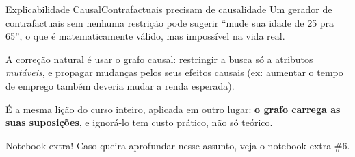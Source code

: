 \begin{frame}{Explicabilidade Causal}{Contrafactuais precisam de causalidade}
    Um gerador de contrafactuais sem nenhuma restrição pode sugerir ``mude sua idade de 25 pra 65'', o que é matematicamente válido, mas impossível na vida real.

    \pause
    \vfill
    A correção natural é usar o grafo causal: restringir a busca só a atributos \textit{mutáveis}, e propagar mudanças pelos seus efeitos causais (ex: aumentar o tempo de emprego também deveria mudar a renda esperada).

    \pause
    \vfill
    É a mesma lição do curso inteiro, aplicada em outro lugar: \textbf{o grafo carrega as suas suposições}, e ignorá-lo tem custo prático, não só teórico.

    \begin{alertblock}{Notebook extra!}
		Caso queira aprofundar nesse assunto, veja o notebook extra \#6.
	\end{alertblock}
\end{frame}

